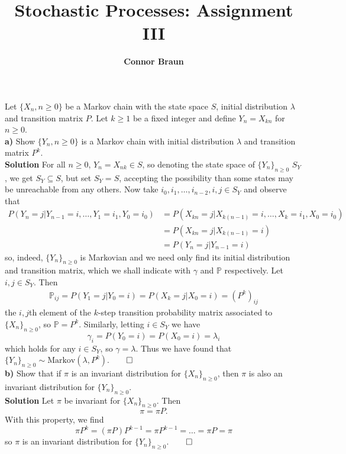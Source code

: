 \documentclass[11pt, letterpaper]{article}
\title{\bf Stochastic Processes: Assignment III}
\author{\bf Connor Braun}
\date{}
\newcommand{\mbb}[1]{\mathbb{#1}}
\begin{document}
 
    \maketitle
     Let $\{X_n,n\geq 0\}$ be a Markov chain with the state space $S$, initial distribution $\lambda$ and transition matrix $P$. Let $k\geq 1$ be a fixed integer
    and define $Y_n=X_{kn}$ for $n\geq 0$.\\[10pt]
    {\bf a)} Show $\{Y_n,n\geq 0\}$ is a Markov chain with initial distribution $\lambda$ and transition matrix $P^k$.\\[10pt]
    {\bf Solution} For all $n\geq 0$, $Y_n=X_{nk}\in S$, so denoting the state space of $\{Y_n\}_{n\geq 0}$ $S_Y$, we get $S_Y\subseteq S$, but set $S_Y=S$, accepting the possibility
    than some states may be unreachable from any others. Now take $i_0,i_1,\dots,i_{n-2},i,j\in S_Y$ and observe that
    \begin{align*}
        P(Y_n=j|Y_{n-1}=i,\dots,Y_1=i_1,Y_0=i_0)&=P(X_{kn}=j|X_{k(n-1)}=i,\dots,X_{k}=i_1,X_0=i_0)\\
        &=P(X_{kn}=j|X_{k(n-1)}=i)\\
        &=P(Y_n=j|Y_{n-1}=i)
    \end{align*}
    so, indeed, $\{Y_n\}_{n\geq 0}$ is Markovian and we need only find its initial distribution and transition matrix, which we shall indicate with $\gamma$ and $\mbb{P}$ respectively.
    Let $i,j\in S_Y$. Then
    \begin{align*}
        \mbb{P}_{ij}=P(Y_1=j|Y_0=i)=P(X_k=j|X_0=i)=(P^k)_{ij}
    \end{align*}
    the $i,j$th element of the $k$-step transition probability matrix associated to $\{X_n\}_{n\geq 0}$, so $\mbb{P}=P^k$. Similarly, letting $i\in S_Y$ we have
    \[\gamma_i=P(Y_0=i)=P(X_0=i)=\lambda_i\]
    which holds for any $i\in S_Y$, so $\gamma=\lambda$. Thus we have found that $\{Y_n\}_{n\geq 0}\sim\text{Markov}(\lambda,P^k)$.\hfill{$\qed$}\\[10pt]
    {\bf b)} Show that if $\pi$ is an invariant distribution for $\{X_n\}_{n\geq 0}$, then $\pi$ is also an invariant distribution for $\{Y_n\}_{n\geq 0}$.\\[10pt]
    {\bf Solution} Let $\pi$ be invariant for $\{X_n\}_{n\geq 0}$. Then
    \[\pi=\pi P.\]
    With this property, we find
    \[\pi P^k=(\pi P)P^{k-1}=\pi P^{k-1}=\dots=\pi P=\pi\]
    so $\pi$ is an invariant distribution for $\{Y_n\}_{n\geq 0}$.\hfill{$\qed$}
\end{document}

